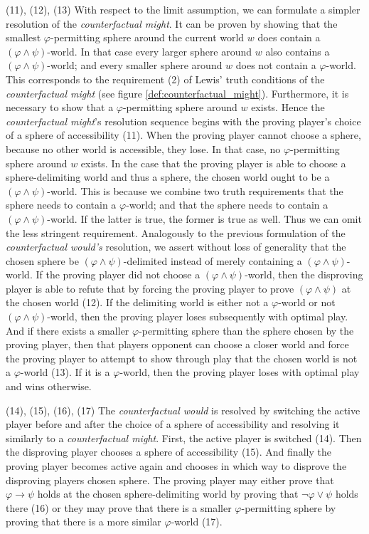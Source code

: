 \documentclass[a4paper,american,10pt]{paper}
\theoremstyle{definition}\newtheorem{definition}{Definition}
\begin{document}
\indent (11), (12), (13) With respect to the limit assumption, we can formulate a simpler resolution of the \textit{counterfactual might}. It can be proven by showing that the smallest $\varphi$-permitting sphere around the current world $w$ does contain a $(\varphi\wedge\psi )$-world. In that case every larger sphere around $w$ also contains a $(\varphi\wedge\psi )$-world; and every smaller sphere around $w$ does not contain a $\varphi$-world. This corresponds to the requirement (2) of Lewis' truth conditions of the \textit{counterfactual might} (see figure \ref{def:counterfactual_might}). Furthermore, it is necessary to show that a $\varphi$-permitting sphere around $w$ exists. Hence the \textit{counterfactual might}'s resolution sequence begins with the proving player's choice of a sphere of accessibility (11). When the proving player cannot choose a sphere, because no other world is accessible, they lose. In that case, no $\varphi$-permitting sphere around $w$ exists. In the case that the proving player is able to choose a sphere-delimiting world and thus a sphere, the chosen world ought to be a $(\varphi\wedge\psi )$-world. This is because we combine two truth requirements that the sphere needs to contain a $\varphi$-world; and that the sphere needs to contain a $(\varphi\wedge\psi )$-world. If the latter is true, the former is true as well. Thus we can omit the less stringent requirement. Analogously to the previous formulation of the \textit{counterfactual would's} resolution, we assert without loss of generality that the chosen sphere be $(\varphi\wedge\psi )$-delimited instead of merely containing a $(\varphi\wedge\psi )$-world. If the proving player did not choose a $(\varphi\wedge\psi )$-world, then the disproving player is able to refute that by forcing the proving player to prove $(\varphi\wedge\psi )$ at the chosen world (12). If the delimiting world is either not a $\varphi$-world or not $(\varphi\wedge\psi )$-world, then the proving player loses subsequently with optimal play. And if there exists a smaller $\varphi$-permitting sphere than the sphere chosen by the proving player, then that players opponent can choose a closer world and force the proving player to attempt to show through play that the chosen world is not a $\varphi$-world (13). If it is a $\varphi$-world, then the proving player loses with optimal play and wins otherwise.

(14), (15), (16), (17) The \textit{counterfactual would} is resolved by switching the active player before and after the choice of a sphere of accessibility and resolving it similarly to a \textit{counterfactual might}. First, the active player is switched (14). Then the disproving player chooses a sphere of accessibility (15). And finally the proving player becomes active again and chooses in which way to disprove the disproving players chosen sphere. The proving player may either prove that $\varphi\rightarrow\psi$ holds at the chosen sphere-delimiting world by proving that $\neg\varphi\vee\psi$ holds there (16) or they may prove that there is a smaller $\varphi$-permitting sphere by proving that there is a more similar $\varphi$-world (17).
\end{document}
